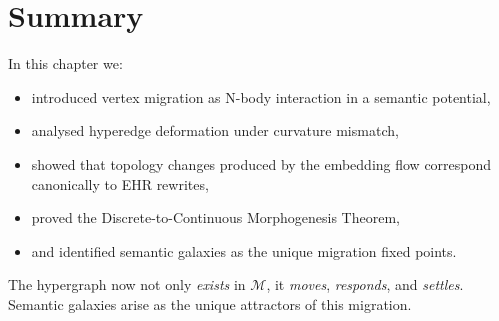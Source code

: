 \section{Summary}

In this chapter we:

\begin{itemize}
\item introduced vertex migration as N-body interaction in a semantic potential,
\item analysed hyperedge deformation under curvature mismatch,
\item showed that topology changes produced by the embedding flow correspond
canonically to EHR rewrites,
\item proved the Discrete-to-Continuous Morphogenesis Theorem,
\item and identified semantic galaxies as the unique migration fixed points.
\end{itemize}

The hypergraph now not only \emph{exists} in $\mathcal{M}$, it \emph{moves},
\emph{responds}, and \emph{settles}.  
Semantic galaxies arise as the unique attractors of this migration.
